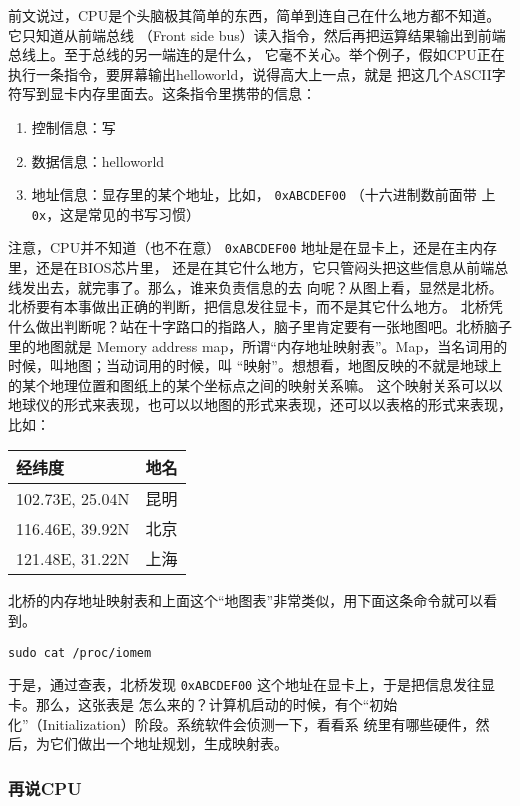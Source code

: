 \documentclass{wx672ctexart}
\begin{document}
前文说过，CPU是个头脑极其简单的东西，简单到连自己在什么地方都不知道。它只知道从前端总线
（Front side bus）读入指令，然后再把运算结果输出到前端总线上。至于总线的另一端连的是什么，
它毫不关心。举个例子，假如CPU正在执行一条指令，要屏幕输出helloworld，说得高大上一点，就是
把这几个ASCII字符写到显卡内存里面去。这条指令里携带的信息：
\begin{enumerate}
\item 控制信息：写
\item 数据信息：helloworld
\item 地址信息：显存里的某个地址，比如， \texttt{0xABCDEF00} （十六进制数前面带
  上 \texttt{0x}，这是常见的书写习惯）
\end{enumerate}

注意，CPU并不知道（也不在意） \texttt{0xABCDEF00} 地址是在显卡上，还是在主内存里，还是在BIOS芯片里，
还是在其它什么地方，它只管闷头把这些信息从前端总线发出去，就完事了。那么，谁来负责信息的去
向呢？从图上看，显然是北桥。北桥要有本事做出正确的判断，把信息发往显卡，而不是其它什么地方。
北桥凭什么做出判断呢？站在十字路口的指路人，脑子里肯定要有一张地图吧。北桥脑子里的地图就是
Memory address map，所谓“内存地址映射表”。Map，当名词用的时候，叫地图；当动词用的时候，叫
“映射”。想想看，地图反映的不就是地球上的某个地理位置和图纸上的某个坐标点之间的映射关系嘛。
这个映射关系可以以地球仪的形式来表现，也可以以地图的形式来表现，还可以以表格的形式来表现，
比如：
\begin{center}
\begin{tabular}{ll}
\hline
经纬度 & 地名\\
\hline
102.73E, 25.04N & 昆明\\
116.46E, 39.92N & 北京\\
121.48E, 31.22N & 上海\\
\hline
\end{tabular}
\end{center}

北桥的内存地址映射表和上面这个“地图表”非常类似，用下面这条命令就可以看到。
\begin{verbatim}
sudo cat /proc/iomem
\end{verbatim}

于是，通过查表，北桥发现 \texttt{0xABCDEF00} 这个地址在显卡上，于是把信息发往显卡。那么，这张表是
怎么来的？计算机启动的时候，有个“初始化”（Initialization）阶段。系统软件会侦测一下，看看系
统里有哪些硬件，然后，为它们做出一个地址规划，生成映射表。

\subsubsection{再说CPU}
\label{sec:orgfe4ee57}
\end{document}
